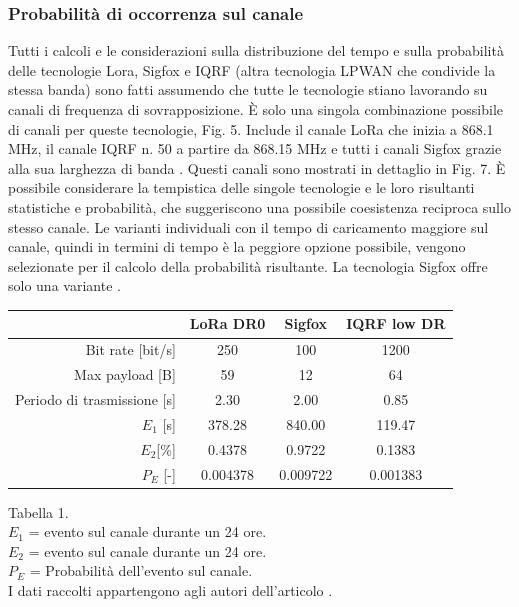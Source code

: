 \documentclass[a4paper]{report} %
\begin{document}
\subsubsection{Probabilità di occorrenza sul canale}
Tutti i calcoli e le considerazioni sulla distribuzione del tempo e sulla probabilità delle tecnologie Lora, Sigfox e IQRF (altra tecnologia LPWAN che condivide la stessa banda) sono fatti assumendo che tutte le tecnologie stiano lavorando su canali di frequenza di sovrapposizione. È solo una singola combinazione possibile di canali per queste tecnologie, Fig. 5. Include il canale LoRa che inizia a 868.1 MHz, il canale IQRF n. 50 a partire da 868.15 MHz e tutti i canali Sigfox grazie alla sua larghezza di banda \cite{art:rif.46}. 
Questi canali sono mostrati in dettaglio in Fig. 7. È possibile considerare la tempistica delle singole tecnologie e le loro risultanti statistiche e probabilità, che suggeriscono una possibile coesistenza reciproca sullo stesso canale. Le varianti individuali con il tempo di caricamento maggiore sul canale, quindi in termini di tempo è la peggiore opzione possibile, vengono selezionate per il calcolo della probabilità risultante. La tecnologia Sigfox offre solo una variante \cite{art:rif.46}.
\begin{center}
\begin{tabular}{r|c|c|c|}
&LoRa DR0&Sigfox&IQRF low DR\\ \hline
Bit rate [bit/s]&250&100&1200\\ \hline
Max payload [B]&59&12&64\\ \hline
Periodo di trasmissione [s]&2.30&2.00&0.85\\ \hline
$E_1$ [s]&378.28&840.00&119.47\\ \hline
$E_2$[\%]&0.4378&0.9722&0.1383\\ \hline
$P_E$ [-]&0.004378&0.009722&0.001383\\ \hline
\end{tabular}
Tabella 1. \\
$E_1$ = evento sul canale durante un 24 ore. \\
$E_2$ = evento sul canale durante un 24 ore. \\
$P_E$ = Probabilità dell'evento sul canale. \\
I dati raccolti appartengono agli autori dell'articolo \cite{art:rif.46}. \\

\end{center}
\end{document}
